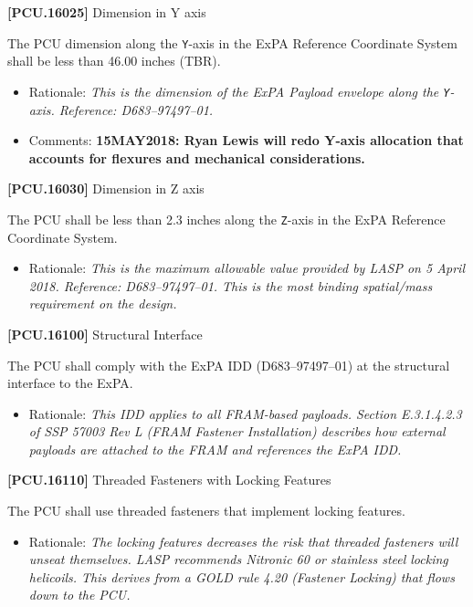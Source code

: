 \textbf{[PCU.16025]} Dimension in Y axis

The \gls{PCU} dimension along the \texttt{Y}-axis in the \gls{ExPA} Reference Coordinate System shall be less than 46.00 inches (TBR\label{tbx_13}).

\begin{itemize}
\item{} Rationale: \emph{This is the dimension of the ExPA Payload envelope along the \texttt{Y}-axis. Reference: D683--97497--01.}

\item{} Comments: \textbf{15MAY2018: Ryan Lewis will redo Y-axis allocation that accounts for flexures and mechanical considerations.}

\end{itemize}

\textbf{[PCU.16030]} Dimension in Z axis

The \gls{PCU} shall be less than 2.3 inches along the \texttt{Z}-axis in the \gls{ExPA} Reference Coordinate System.

\begin{itemize}
\item{} Rationale: \emph{This is the maximum allowable value provided by LASP on 5 April 2018. Reference: D683--97497--01. This is the most binding spatial\slash mass requirement on the design.}

\end{itemize}

\textbf{[PCU.16100]} Structural Interface

The \gls{PCU} shall comply with the \gls{ExPA} \gls{IDD} (D683--97497--01) at the structural interface to the \gls{ExPA}.

\begin{itemize}
\item{} Rationale: \emph{This IDD applies to all FRAM-based payloads. Section E.3.1.4.2.3 of SSP 57003 Rev L (FRAM Fastener Installation) describes how external payloads are attached to the FRAM and references the ExPA IDD.}

\end{itemize}

\textbf{[PCU.16110]} Threaded Fasteners with Locking Features

The \gls{PCU} shall use threaded fasteners that implement locking features.

\begin{itemize}
\item{} Rationale: \emph{The locking features decreases the risk that threaded fasteners will unseat themselves. LASP recommends Nitronic 60 or stainless steel locking helicoils. This derives from a GOLD rule 4.20 (Fastener Locking) that flows down to the PCU.}

\end{itemize}

